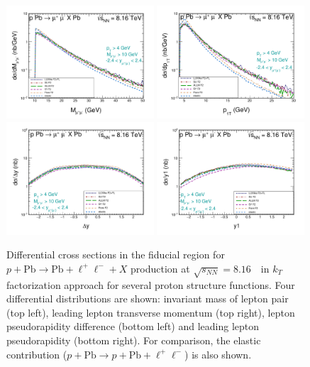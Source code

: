 \begin{figure}[!h]
 \includegraphics[width=0.49\textwidth]{figures_Marta/Mll-c.pdf}
  \includegraphics[width=0.49\textwidth]{figures_Marta/pt1-c.pdf}
 \includegraphics[width=0.49\textwidth]{figures_Marta/ydiff-c.pdf}
  \includegraphics[width=0.49\textwidth]{figures_Marta/y1-c.pdf}
\caption{Differential cross sections in the fiducial region for $p+\textrm{Pb}\rightarrow \textrm{Pb} + \ell^+\ell^- + X$ production at $\sqrt{s_{N N}} = 8.16$~\TeV\ in $k_T$ factorization approach for several proton structure functions.
Four differential distributions are shown: invariant mass of lepton pair (top left), leading lepton transverse momentum (top right),
lepton pseudorapidity difference (bottom left) and leading lepton pseudorapidity (bottom right).
For comparison, the elastic contribution ($p+\textrm{Pb}\rightarrow p+ \textrm{Pb} + \ell^+\ell^-$) is also shown.
}
 \label{fig:kt_figures1}
\end{figure}



